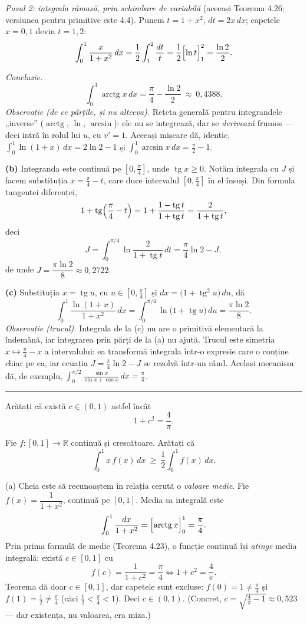 \emph{Pasul 2: integrala rămasă, prin schimbare de variabilă} (aceeași Teorema 4.26; versiunea pentru primitive este 4.4). Punem $t=1+x^{2}$, $dt=2x\,dx$; capetele $x=0,1$ devin $t=1,2$:
\[ \int_{0}^{1}\frac{x}{1+x^{2}}\,dx=\frac12\int_{1}^{2}\frac{dt}{t}=\frac12\Bigl[\ln t\Bigr]_{1}^{2}=\frac{\ln2}{2} . \]

\emph{Concluzie.}
\[ \int_{0}^{1}\operatorname{arctg}x\,dx=\frac{\pi}{4}-\frac{\ln2}{2}\ \approx\ 0{,}4388 . \]
\emph{Observație (de ce părțile, și nu altceva).} Rețeta generală pentru integrandele „inverse'' ($\operatorname{arctg}$, $\ln$, $\arcsin$): ele nu se integrează, dar se \emph{derivează} frumos --- deci intră în rolul lui $u$, cu $v'=1$. Aceeași mișcare dă, identic, $\int_{0}^{1}\ln(1+x)\,dx=2\ln2-1$ și $\int_{0}^{1}\arcsin x\,dx=\frac{\pi}{2}-1$.

\textbf{(b)} Integranda este continuă pe $\left[0,\frac\pi4\right]$, unde $\operatorname{tg}x\ge0$. Notăm integrala cu $J$ și facem substituția $x=\frac\pi4-t$, care duce intervalul $\left[0,\frac\pi4\right]$ în el însuși. Din formula tangentei diferenței,
\[ 1+\operatorname{tg}\Bigl(\frac\pi4-t\Bigr)=1+\frac{1-\operatorname{tg}t}{1+\operatorname{tg}t}=\frac{2}{1+\operatorname{tg}t}, \]
deci
\[ J=\int_{0}^{\pi/4}\ln\frac{2}{1+\operatorname{tg}t}\,dt=\frac{\pi}{4}\ln2-J , \]
de unde $J=\dfrac{\pi\ln2}{8}\approx0{,}2722$.

\textbf{(c)} Substituția $x=\operatorname{tg}u$, cu $u\in\left[0,\frac\pi4\right]$ și $dx=\bigl(1+\operatorname{tg}^{2}u\bigr)\,du$, dă
\[ \int_{0}^{1}\frac{\ln(1+x)}{1+x^{2}}\,dx=\int_{0}^{\pi/4}\ln\bigl(1+\operatorname{tg}u\bigr)\,du=\frac{\pi\ln2}{8} . \]
\emph{Observație (trucul).} Integrala de la (c) nu are o primitivă elementară la îndemână, iar integrarea prin părți de la (a) nu ajută. Trucul este simetria $x\mapsto\frac\pi4-x$ a intervalului: ea transformă integrala într-o expresie care o conține chiar pe ea, iar ecuația $J=\frac\pi4\ln2-J$ se rezolvă într-un rând. Același mecanism dă, de exemplu, $\int_{0}^{\pi/2}\frac{\sin x}{\sin x+\cos x}\,dx=\frac\pi4$.
\vspace{1mm}\hrule

\begin{parti}
  \item Arătați că există $c\in(0,1)$ astfel încât
  \[ 1+c^{2}=\frac{4}{\pi} . \]
  \item Fie $f:[0,1]\to\mathbb{R}$ continuă și crescătoare. Arătați că
  \[ \int_{0}^{1}x\,f(x)\,dx\ \ge\ \frac12\int_{0}^{1}f(x)\,dx . \]
\end{parti}
\sol (a) Cheia este să recunoaștem în relația cerută o \emph{valoare medie}. Fie $f(x)=\dfrac{1}{1+x^{2}}$, continuă pe $[0,1]$. Media sa integrală este
\[ \int_{0}^{1}\frac{dx}{1+x^{2}}=\Bigl[\operatorname{arctg}x\Bigr]_{0}^{1}=\frac{\pi}{4} . \]
Prin prima formulă de medie (Teorema 4.23), o funcție continuă își \emph{atinge} media integrală: există $c\in[0,1]$ cu
\[ f(c)=\frac{1}{1+c^{2}}=\frac{\pi}{4} \Longleftrightarrow 1+c^{2}=\frac{4}{\pi} . \]
Teorema dă doar $c\in[0,1]$, dar capetele sunt excluse: $f(0)=1\neq\frac\pi4$ și $f(1)=\frac12\neq\frac\pi4$ (căci $\frac12<\frac\pi4<1$). Deci $c\in(0,1)$.
(Concret, $c=\sqrt{\frac{4}{\pi}-1}\approx0{,}523$ --- dar existența, nu valoarea, era miza.)

